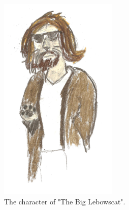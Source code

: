 \documentclass[12pt]{IEEEtran}
\begin{document}
	\begin{figure}[h]
		\centering
		\includegraphics[width=0.5\textwidth]{lebowski_cat.jpg}
		\caption{The character of "The Big Lebowscat".}
		\label{fig:lebowscat}
	\end{figure}
\end{document}
